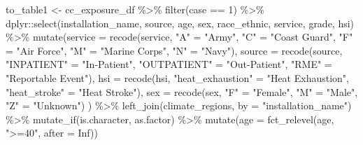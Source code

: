 \documentclass[
]{article}
\newenvironment{Shaded}{\begin{snugshade}}{\end{snugshade}}
\newcommand{\AttributeTok}[1]{\textcolor[rgb]{0.77,0.63,0.00}{#1}}
\newcommand{\ConstantTok}[1]{\textcolor[rgb]{0.00,0.00,0.00}{#1}}
\newcommand{\DecValTok}[1]{\textcolor[rgb]{0.00,0.00,0.81}{#1}}
\newcommand{\FunctionTok}[1]{\textcolor[rgb]{0.00,0.00,0.00}{#1}}
\newcommand{\NormalTok}[1]{#1}
\newcommand{\OtherTok}[1]{\textcolor[rgb]{0.56,0.35,0.01}{#1}}
\newcommand{\SpecialCharTok}[1]{\textcolor[rgb]{0.00,0.00,0.00}{#1}}
\newcommand{\StringTok}[1]{\textcolor[rgb]{0.31,0.60,0.02}{#1}}
\begin{document}
\begin{Shaded}
\begin{Highlighting}[]
\NormalTok{to\_table1 }\OtherTok{\textless{}{-}}
\NormalTok{  cc\_exposure\_df }\SpecialCharTok{\%\textgreater{}\%} 
    \FunctionTok{filter}\NormalTok{(case }\SpecialCharTok{==} \DecValTok{1}\NormalTok{) }\SpecialCharTok{\%\textgreater{}\%} 
\NormalTok{    dplyr}\SpecialCharTok{::}\FunctionTok{select}\NormalTok{(installation\_name, source, age, sex, race\_ethnic, service, grade, hsi) }\SpecialCharTok{\%\textgreater{}\%} 
       \FunctionTok{mutate}\NormalTok{(}\AttributeTok{service =} \FunctionTok{recode}\NormalTok{(service,}
            \StringTok{"A"} \OtherTok{=} \StringTok{"Army"}\NormalTok{,}
            \StringTok{"C"} \OtherTok{=} \StringTok{"Coast Guard"}\NormalTok{,}
            \StringTok{"F"} \OtherTok{=} \StringTok{"Air Force"}\NormalTok{,}
            \StringTok{"M"} \OtherTok{=} \StringTok{"Marine Corps"}\NormalTok{,}
            \StringTok{"N"} \OtherTok{=} \StringTok{"Navy"}\NormalTok{),}
            \AttributeTok{source =} \FunctionTok{recode}\NormalTok{(source,}
            \StringTok{"INPATIENT"} \OtherTok{=} \StringTok{"In{-}Patient"}\NormalTok{,}
            \StringTok{"OUTPATIENT"} \OtherTok{=} \StringTok{"Out{-}Patient"}\NormalTok{,}
            \StringTok{"RME"} \OtherTok{=} \StringTok{"Reportable Event"}\NormalTok{),}
            \AttributeTok{hsi =} \FunctionTok{recode}\NormalTok{(hsi,}
            \StringTok{"heat\_exhaustion"} \OtherTok{=} \StringTok{"Heat Exhaustion"}\NormalTok{,}
            \StringTok{"heat\_stroke"} \OtherTok{=} \StringTok{"Heat Stroke"}\NormalTok{),}
            \AttributeTok{sex =} \FunctionTok{recode}\NormalTok{(sex,}
            \StringTok{"F"} \OtherTok{=} \StringTok{"Female"}\NormalTok{,}
            \StringTok{"M"} \OtherTok{=} \StringTok{"Male"}\NormalTok{,}
            \StringTok{"Z"} \OtherTok{=} \StringTok{"Unknown"}\NormalTok{)}
\NormalTok{            ) }\SpecialCharTok{\%\textgreater{}\%} 
  \FunctionTok{left\_join}\NormalTok{(climate\_regions, }\AttributeTok{by =} \StringTok{"installation\_name"}\NormalTok{) }\SpecialCharTok{\%\textgreater{}\%} 
  \FunctionTok{mutate\_if}\NormalTok{(is.character, as.factor) }\SpecialCharTok{\%\textgreater{}\%} 
            \FunctionTok{mutate}\NormalTok{(}\AttributeTok{age =} \FunctionTok{fct\_relevel}\NormalTok{(age, }\StringTok{"\textgreater{}=40"}\NormalTok{, }\AttributeTok{after =} \ConstantTok{Inf}\NormalTok{))}



\end{Highlighting}
\end{Shaded}
\end{document}

